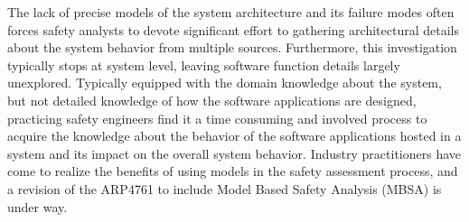 The lack of precise models of the system architecture and its failure modes often forces safety analysts to devote significant effort to gathering architectural details about the system behavior from multiple sources. Furthermore, this investigation typically stops at system level, leaving software function details largely unexplored. Typically equipped with the domain knowledge about the system, but not detailed knowledge of how the software applications are designed, practicing safety engineers find it a time consuming and involved process to acquire the knowledge about the behavior of the software applications hosted in a system and its impact on the overall system behavior.
Industry practitioners have come to realize the benefits of using models in the safety assessment process, and a revision of the ARP4761 to include Model Based Safety Analysis (MBSA) is under way. 











